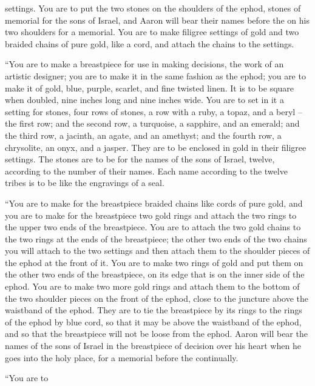 {settings.
You are to put
the
two
stones
on
the shoulders
of the ephod,
stones
of memorial
for the sons
of Israel,
and Aaron
will bear
their names
before
the {}
on
his two
shoulders
for a memorial.
You are to make
filigree settings
of gold
and two
braided
chains
of pure
gold,
like a cord,
and attach
the chains
to the settings.
\par }{\PP {}“You are to make
a breastpiece
for use in making decisions,
the work
of an artistic
designer; you
are to make
it in the same fashion as the ephod;
you are to make
it of gold,
blue,
purple,
scarlet,
and fine
twisted
linen.
It is to be square
when doubled,
nine
inches long
and nine
inches wide.
You are to set
in it a setting
for stones,
four
rows
of stones,
a row
with a ruby,
a topaz,
and a beryl
– the first
row;
and the second
row,
a turquoise,
a sapphire,
and an emerald;
and the third
row,
a jacinth,
an agate,
and an amethyst;
and the fourth
row,
a chrysolite,
an onyx,
and a jasper.
They are to be
enclosed
in gold
in their filigree settings.
The stones
are to be
for
the names
of the sons
of Israel,
twelve,
according
to the number of their names.
Each
name
according
to the twelve
tribes
is to be
like the engravings
of a seal.
\par }{\PP {}“You are to make
for
the breastpiece
braided
chains
like cords
of pure
gold,
and you are to make
for the breastpiece
two
gold
rings
and attach
the
two
rings
to the upper two
ends
of the breastpiece.
You
are to attach
the two
gold
chains
to the two
rings
at the ends
of the breastpiece;
the
other two
ends
of the two
chains
you will attach
to the two
settings
and then attach them
to the shoulder pieces
of the ephod
at the front of it.
You are to make
two
rings
of gold
and put
them
on
the other two
ends
of the breastpiece,
on
its edge
that
is on the inner side
of the ephod.
You are to make
two
more gold
rings
and attach them
to the
bottom
of the two
shoulder pieces
on the front
of the
ephod,
close
to the juncture
above
the waistband
of the ephod.
They are to tie
the breastpiece
by its rings
to
the rings
of the ephod
by blue
cord,
so that it may be
above
the waistband
of the ephod,
and so that the breastpiece
will not
be loose
from
the ephod.
Aaron
will bear
the names
of the sons
of Israel
in the breastpiece
of decision
over
his heart
when he goes
into
the holy
place, for a memorial
before
the {}
continually.
\par }{\PP {}“You are to
}
